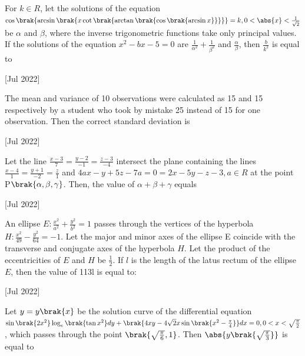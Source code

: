  
    \item For $k\in R$, let the solutions of the equation $\cos\brak{\arcsin\brak{x\cot\brak{\arctan\brak{\cos\brak{\arcsin x}}}}}=k,0<\abs{x}<\frac{1}{\sqrt{2}}$ be $\alpha$ and $\beta$, where the inverse trigonometric functions take only principal values. If the solutions of the equation $x^2-bx-5=0$ are $\frac{1}{\alpha^2}+\frac{1}{\beta^2}$ and $\frac{\alpha}{\beta}$, then $\frac{b}{k^2}$ is equal to
    
    \hfill{[Jul 2022]}

    \item The mean and variance of 10 observations were calculated as 15 and 15 respectively by a student who took by mistake 25 instead of 15 for one observation. Then the correct standard deviation is
    
    \hfill{[Jul 2022]}
		
    \item Let the line $\frac{x-3}{7}=\frac{y-2}{-1}=\frac{z-3}{-4}$ intersect the plane containing the lines $\frac{x-4}{1}=\frac{y+1}{-2}=\frac{z}{1}$ and $4ax-y+5z-7a=0=2x-5y-z-3,a\in R$ at the point P$\brak{\alpha,\beta,\gamma}$. Then, the value of $\alpha+\beta+\gamma$ equals
    
    \hfill{[Jul 2022]}

    \item An ellipse $E:\frac{x^2}{a^2}+\frac{y^2}{b^2}=1$ passes through the vertices of the hyperbola $H:\frac{x^2}{49}-\frac{y^2}{64}=-1$. Let the major and minor axes of the ellipse E coincide with the transverse and conjugate axes of the hyperbola $H$. Let the product of the eccentricities of $E$ and $H$ be $\frac{1}{2}$. If $l$ is the length of the latus rectum of the ellipse $E$, then the value of 113l is equal to:
    
    \hfill{[Jul 2022]}

    \item Let $y=y\brak{x}$ be the solution curve of the differential equation $\sin\brak{2x^2}\log_e\brak{\tan x^2}dy+\brak{4xy-4\sqrt{2}x\sin\brak{x^2-\frac{\pi}{4}}}dx=0, 0<x<\sqrt{\frac{\pi}{2}}$, which passes through the point $\brak{\sqrt{\frac{\pi}{6}},1}$. Then $\abs{y\brak{\sqrt{\frac{\pi}{3}}}}$ is equal to
    
